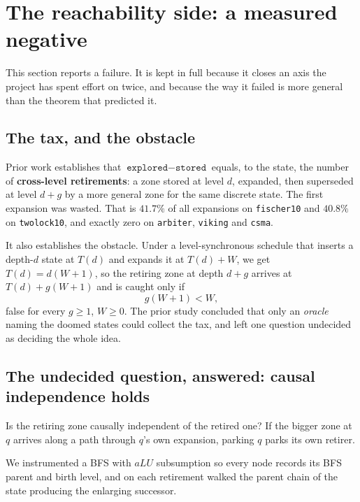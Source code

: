 \section{The reachability side: a measured negative}
\label{sec:deferral}

This section reports a failure. It is kept in full because it closes an axis the project has spent
effort on twice, and because the way it failed is more general than the theorem that predicted it.

\subsection{The tax, and the obstacle}

Prior work establishes that $\texttt{explored} - \texttt{stored}$ equals, to the state, the number
of \textbf{cross-level retirements}: a zone stored at level $d$, expanded, then superseded at level
$d+g$ by a more general zone for the same discrete state. The first expansion was wasted. That is
$41.7\%$ of all expansions on \texttt{fischer10} and $40.8\%$ on \texttt{twolock10}, and exactly
zero on \texttt{arbiter}, \texttt{viking} and \texttt{csma}. \measured{}

It also establishes the obstacle. Under a level-synchronous schedule that inserts a depth-$d$ state
at $T(d)$ and expands it at $T(d)+W$, we get $T(d) = d(W+1)$, so the retiring zone at depth $d+g$
arrives at $T(d) + g(W+1)$ and is caught only if
\begin{equation}
  g(W+1) < W, \label{eq:nodelay}
\end{equation}
false for every $g \ge 1$, $W \ge 0$. \proved{} The prior study concluded that only an
\emph{oracle} naming the doomed states could collect the tax, and left one question undecided as
deciding the whole idea.

\subsection{The undecided question, answered: causal independence holds}

Is the retiring zone causally independent of the retired one? If the bigger zone at $q$ arrives
along a path through $q$'s own expansion, parking $q$ parks its own retirer.

We instrumented a BFS with $aLU$ subsumption so every node records its BFS parent and birth level,
and on each retirement walked the parent chain of the state producing the enlarging successor.

